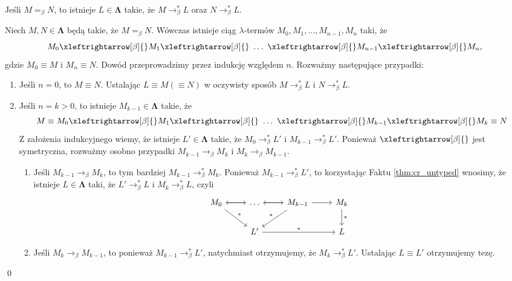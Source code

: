 \begin{wniosek}\label{thm:ch_wniosek1_untyped}
  Jeśli \(M=_\beta N\), to istnieje \(L\in\mathbf{\Lambda}\) takie, że \(M\to^{*}_\beta L\) oraz \(N\to^{*}_\beta L\).
\end{wniosek}
\begin{dowod}
  Niech \(M, N\in\mathbf{\Lambda}\) będą takie, że \(M=_\beta N\). Wówczas istnieje ciąg \(\lambda\)-termów \(M_0, M_1, \dots, M_{n-1}, M_n\) taki, że
  \[
    M_0\xleftrightarrow[\beta]{}M_1\xleftrightarrow[\beta]{}\ \dots\ \xleftrightarrow[\beta]{}M_{n-1}\xleftrightarrow[\beta]{}M_n,
  \]
  gdzie \(M_0\equiv M\) i \(M_n \equiv N\). Dowód przeprowadzimy przez indukcję względem \(n\). Rozważmy następujące przypadki:
  \begin{enumerate}[label={(\arabic*)}, ref={(\arabic*)}]
    \setlength\itemsep{0em}
    \item Jeśli \(n=0\), to \(M\equiv N\). Ustalając \(L\equiv M (\equiv N)\) w oczywisty sposób \(M\to^{*}_\beta L\) i \(N\to^{*}_\beta L\).
    \item Jeśli \(n=k>0\), to istnieje \(M_{k-1}\in\mathbf{\Lambda}\) takie, że 
   \[
    M\equiv M_0\xleftrightarrow[\beta]{}M_1\xleftrightarrow[\beta]{}\ \dots\ \xleftrightarrow[\beta]{}M_{k-1}\xleftrightarrow[\beta]{}M_k\equiv N
  \]
      Z założenia indukcyjnego wiemy, że istnieje \(L'\in\mathbf{\Lambda}\) takie, że \(M_0 \to^{*}_\beta L'\) i \(M_{k-1} \to^{*}_\beta L'\). Ponieważ \(\xleftrightarrow[\beta]{}\) jest symetryczna, rozważmy osobno przypadki \(M_{k-1}\to_\beta M_k\) i \(M_{k}\to_\beta M_{k-1}\).
  \begin{enumerate}[label={(\alph*)}, ref={(\alph*)}]
    \setlength\itemsep{0em}
    \item Jeśli \(M_{k-1}\to_\beta M_k\), to tym bardziej \(M_{k-1}\to^{*}_\beta M_k\). Ponieważ \(M_{k-1}\to^{*}_\beta L'\), to korzystając Faktu \ref{thm:cr_untyped} wnosimy, że istnieje \(L\in\mathbf{\Lambda}\) taki, że \(L'\to^{*}_\beta L\) i \(M_k \to^{*}_\beta L\), czyli
               \[ \begin{tikzcd}
                 M_0 \arrow{r} \arrow{dr}{*} & \dots \arrow{l} \arrow{r} &  M_{k-1} \arrow{l}{} \arrow{r}{} \arrow[swap]{dl}{*} & M_k \arrow{d}{*} \\%
                 & L' \arrow{rr}{*} & & L 
               \end{tikzcd}
               \] 
             \item Jeśli \(M_{k}\to_\beta M_{k-1}\), to ponieważ \(M_{k-1}\to^{*}_\beta L'\), natychmiast otrzymujemy, że \(M_k \to^{*}_\beta L'\). Ustalając \(L\equiv L'\) otrzymujemy tezę.
  \end{enumerate}
  \end{enumerate}
  \qed
\end{dowod}


